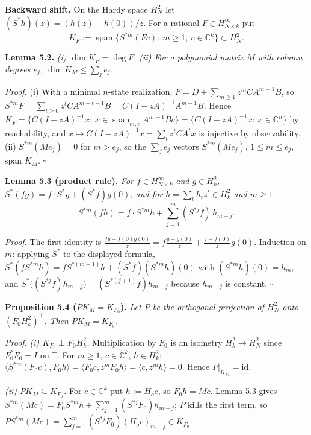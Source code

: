 \documentclass[
  11pt,
  a4paper,
]{article}
\begin{document}
\textbf{Backward shift.} On the Hardy space \(H^2_N\) let
\((S^*h)(z)=(h(z)-h(0))/z\). For a rational
\(F\in H^\infty_{N\times k}\) put
\[K_F:=\operatorname{span}\{S^{*m}(Fc):\ m\ge1,\ c\in\mathbb C^k\}\subset H^2_N .\]

\textbf{Lemma 5.2.} \emph{(i) \(\dim K_F=\deg F\). (ii) For a polynomial
matrix \(M\) with column degrees \(e_j\), \(\dim K_M\le\sum_je_j\).}

\emph{Proof.} (i) With a minimal \(n\)-state realization,
\(F=D+\sum_{m\ge1}z^mCA^{m-1}B\), so
\(S^{*m}F=\sum_{t\ge0}z^tCA^{m+t-1}B=C(I-zA)^{-1}A^{m-1}B\). Hence
\(K_F=\{C(I-zA)^{-1}x:\ x\in\operatorname{span}_{m,\allowbreak{}c}A^{m-1}Bc\}=\{C(I-zA)^{-1}x:\ x\in\mathbb C^n\}\)
by reachability, and \(x\mapsto C(I-zA)^{-1}x=\sum_tz^tCA^tx\) is
injective by observability. (ii) \(S^{*m}(Me_j)=0\) for \(m>e_j\), so
the \(\sum_je_j\) vectors \(S^{*m}(Me_j)\), \(1\le m\le e_j\), span
\(K_M\). \(\square\)

\textbf{Lemma 5.3 (product rule).} \emph{For
\(f\in H^\infty_{N\times k}\) and \(g\in H^2_k\),
\(S^*(fg)=f\cdot S^*g+(S^*f)g(0)\), and for \(h=\sum_th_tz^t\in H^2_k\)
and \(m\ge1\)}
\[S^{*m}(fh)=f\cdot S^{*m}h+\sum_{j=1}^m(S^{*j}f)\,h_{m-j}.\]

\emph{Proof.} The first identity is
\(\frac{fg-f(0)g(0)}z=f\frac{g-g(0)}z+\frac{f-f(0)}zg(0)\). Induction on
\(m\): applying \(S^*\) to the displayed formula,
\(S^*(fS^{*m}h)=fS^{*(m+1)}h+(S^*f)(S^{*m}h)(0)\) with
\((S^{*m}h)(0)=h_m\), and
\(S^*\bigl((S^{*j}f)h_{m-j}\bigr)=(S^{*(j+1)}f)h_{m-j}\) because
\(h_{m-j}\) is constant. \(\square\)

\textbf{Proposition 5.4 (\(PK_M=K_{F_0}\)).} \emph{Let \(P\) be the
orthogonal projection of \(H^2_N\) onto \((F_0H^2_k)^\perp\). Then
\(PK_M=K_{F_0}\).}

\emph{Proof.} \emph{(i) \(K_{F_0}\perp F_0H^2_k\).} Multiplication by
\(F_0\) is an isometry \(H^2_k\to H^2_N\) since \(F_0^*F_0=I\) on
\(\mathbb T\). For \(m\ge1\), \(c\in\mathbb C^k\), \(h\in H^2_k\):
\(\langle S^{*m}(F_0c),\allowbreak{}F_0h\rangle=\langle F_0c,\allowbreak{}z^mF_0h\rangle=\langle c,\allowbreak{}z^mh\rangle=0\).
Hence \(P|_{K_{F_0}}=\mathrm{id}\).

\emph{(ii) \(PK_M\subseteq K_{F_0}\).} For \(c\in\mathbb C^k\) put
\(h:=H_oc\), so \(F_0h=Mc\). Lemma 5.3 gives
\(S^{*m}(Mc)=F_0S^{*m}h+\sum_{j=1}^m(S^{*j}F_0)h_{m-j}\); \(P\) kills
the first term, so
\(PS^{*m}(Mc)=\sum_{j=1}^m(S^{*j}F_0)(H_oc)_{m-j}\in K_{F_0}\).
\end{document}
